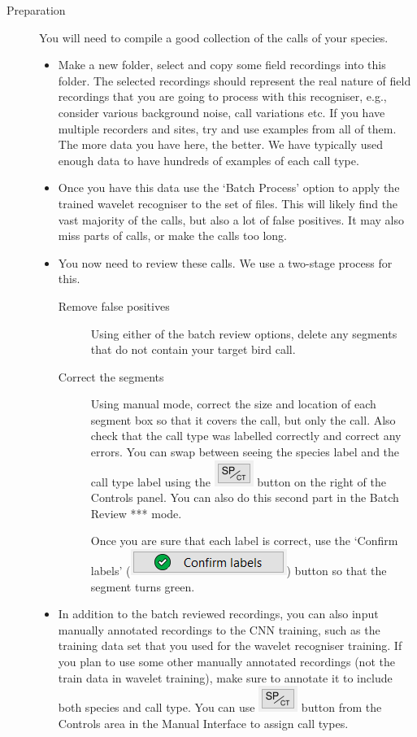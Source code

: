 \documentclass{article}
\begin{document}
\begin{description}
\item[Preparation] You will need to compile a good collection of the calls of your species. 
\begin{itemize}
\item Make a new folder, select and copy some field recordings into this folder. The selected recordings should represent the real nature of field recordings that you are going to process with this recogniser, e.g., consider various background noise, call variations etc. If you have multiple recorders and sites, try and use examples from all of them. The more data you have here, the better. We have typically used enough data to have hundreds of examples of each call type.
\item Once you have this data use the `Batch Process' option to apply the trained wavelet recogniser to the set of files. This will likely find the vast majority of the calls, but also a lot of false positives. It may also miss parts of calls, or make the calls too long. 
\item You now need to review these calls. We use a two-stage process for this.
    \begin{description} 
    \item[Remove false positives] Using either of the batch review options, delete any segments that do not contain your target bird call. 
    \item[Correct the segments] Using manual mode, correct the size and location of each segment box so that it covers the call, but only the call. Also check that the call type was labelled correctly and correct any errors. You can swap between seeing the species label and the call type label using the \includegraphics[scale=0.5]{Figures/SPCT} button on the right of the Controls panel. You can also do this second part in the Batch Review *** mode. 

    Once you are sure that each label is correct, use the `Confirm labels' (\includegraphics[scale=0.5]{Figures/confirmlabels}) button so that the segment turns green.
    \end{description}
\item In addition to the batch reviewed recordings, you can also input manually annotated recordings to the CNN training, such as the training data set that you used for the wavelet recogniser training. If you plan to use some other manually annotated recordings (not the train data in wavelet training), make sure to annotate it to include both species and call type. You can use \includegraphics[scale=0.5]{Figures/SPCT} button from the Controls area in the Manual Interface to assign call types.
\end{itemize}
\end{description}
 
\end{document}
